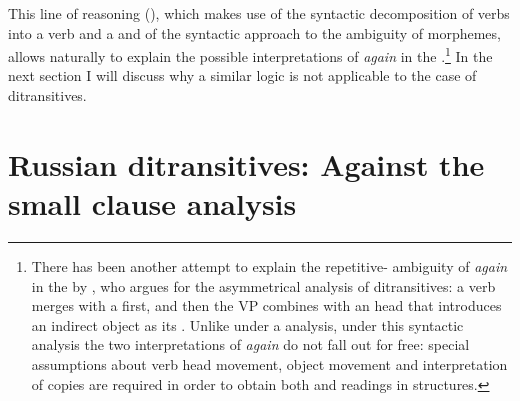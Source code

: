 \documentclass[output=paper]{langscibook}
\begin{document}
This line of reasoning (\citealt{Beck-Johnson2004}), which makes use of the syntactic decomposition of  verbs into a verb and a  and of the syntactic approach to the ambiguity of  morphemes, allows naturally to explain the possible interpretations of  \textit{again} in the .\footnote{There has been another attempt to explain the repetitive- ambiguity of \textit{again} in the   by \citet{Bruening2010}, who argues for the asymmetrical  analysis of  ditransitives: a verb merges with a  first, and then the VP combines with an  head that introduces an indirect object as its . Unlike under a  analysis, under this syntactic analysis the two interpretations of \textit{again} do not fall out for free: special assumptions about verb head movement, object movement and interpretation of copies are required in order to obtain both  and  readings in  structures.} In the next section I will discuss why a similar logic is not applicable to the case of  ditransitives.


\section{Russian ditransitives: Against the small clause analysis}\label{s3}
\end{document}

